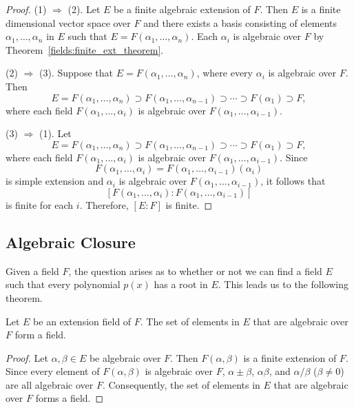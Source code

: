 \begin{proof}
(1) $\Rightarrow$ (2).
Let $E$ be a finite algebraic extension of $F$.  Then $E$ is a finite
dimensional vector space over $F$ and there exists a basis consisting 
of elements $\alpha_1, \ldots, \alpha_n$ in $E$ such that $E =
F(\alpha_1, \ldots, \alpha_n)$. Each $\alpha_i$ is algebraic over $F$
by Theorem~\ref{fields:finite_ext_theorem}. 


(2) $\Rightarrow$ (3).
Suppose that  $E = F(\alpha_1, \ldots, \alpha_n)$, where every
$\alpha_i$ is algebraic over $F$. Then 
\[
E = F(\alpha_1, \ldots, \alpha_n) \supset F(\alpha_1,
\ldots, \alpha_{n-1} ) \supset \cdots \supset
 F( \alpha_1 ) \supset F,
\]
where each field $F(\alpha_1, \ldots, \alpha_i)$ is algebraic over 
$F(\alpha_1, \ldots, \alpha_{i-1})$.
 

(3) $\Rightarrow$ (1). 
Let 
\[
E = F(\alpha_1, \ldots, \alpha_n) \supset F(\alpha_1,
\ldots, \alpha_{n-1} ) \supset \cdots \supset
 F( \alpha_1 ) \supset F,
\]
where each field $F(\alpha_1, \ldots, \alpha_i)$ is algebraic over 
$F(\alpha_1, \ldots, \alpha_{i-1})$. Since 
\[
F(\alpha_1, \ldots, \alpha_i) = 
F(\alpha_1, \ldots, \alpha_{i-1} )(\alpha_i)
\]
is simple extension and $\alpha_i$ is algebraic over $F(\alpha_1,
\ldots, \alpha_{i-1})$, it follows that
\[
[ F(\alpha_1, \ldots, \alpha_i) : F(\alpha_1, \ldots, \alpha_{i-1} )]
\]
is finite for each $i$. Therefore, $[E : F]$ is finite.
\end{proof}
 

 
\subsection*{Algebraic Closure}


Given a field $F$, the question arises as to whether or not we can
find a field $E$ such that every polynomial $p(x)$ has a root in $E$.
This leads us to the following theorem.

 
\begin{theorem}
Let $E$ be an extension field of $F$. The set of elements in $E$ that
are algebraic over $F$ form a field.
\end{theorem}
 
 
\begin{proof}
Let $\alpha, \beta \in E$ be algebraic over $F$. Then $F( \alpha,
\beta )$ is a finite extension of $F$.  Since every element of $F(
\alpha, \beta )$ is algebraic over $F$, $\alpha \pm \beta$, $\alpha 
\beta$, and $\alpha / \beta$ ($\beta \neq 0$) are all algebraic over
$F$. Consequently, the set of elements in $E$ that are algebraic over
$F$ forms a field.  
\end{proof}

